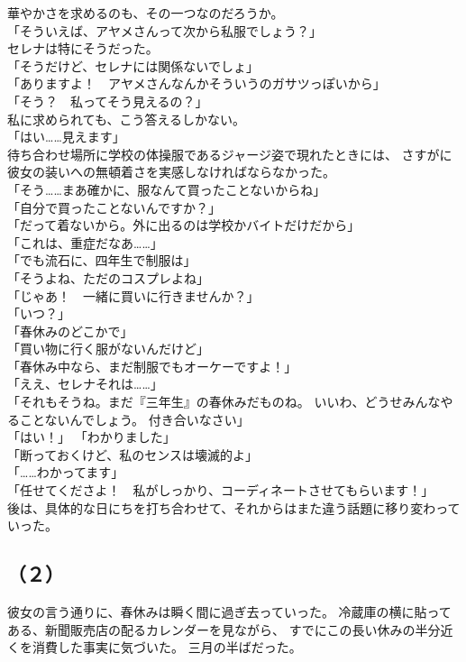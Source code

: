 \documentclass[../IHMain]{subfiles}
\begin{document}
華やかさを求めるのも、その一つなのだろうか。\\
「そういえば、アヤメさんって次から私服でしょう？」\\
セレナは特にそうだった。\\
「そうだけど、セレナには関係ないでしょ」\\
「ありますよ！　アヤメさんなんかそういうのガサツっぽいから」\\
「そう？　私ってそう見えるの？」\\
私に求められても、こう答えるしかない。\\
「はい……見えます」\\
待ち合わせ場所に学校の体操服であるジャージ姿で現れたときには、
さすがに彼女の装いへの無頓着さを実感しなければならなかった。\\
「そう……まあ確かに、服なんて買ったことないからね」\\
「自分で買ったことないんですか？」\\
「だって着ないから。外に出るのは学校かバイトだけだから」\\
「これは、重症だなあ……」\\
「でも流石に、四年生で制服は」\\
「そうよね、ただのコスプレよね」\\
「じゃあ！　一緒に買いに行きませんか？」\\
「いつ？」\\
「春休みのどこかで」\\
「買い物に行く服がないんだけど」\\
「春休み中なら、まだ制服でもオーケーですよ！」\\
「ええ、セレナそれは……」\\
「それもそうね。まだ『三年生』の春休みだものね。
いいわ、どうせみんなやることないんでしょう。
付き合いなさい」\\
「はい！」
「わかりました」\\
「断っておくけど、私のセンスは壊滅的よ」\\
「……わかってます」\\
「任せてくださよ！　私がしっかり、コーディネートさせてもらいます！」\\
後は、具体的な日にちを打ち合わせて、それからはまた違う話題に移り変わっていった。

\subsection*{（２）}
彼女の言う通りに、春休みは瞬く間に過ぎ去っていった。
冷蔵庫の横に貼ってある、新聞販売店の配るカレンダーを見ながら、
すでにこの長い休みの半分近くを消費した事実に気づいた。
三月の半ばだった。
\end{document}
